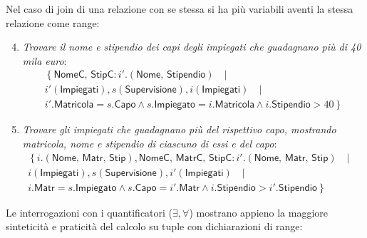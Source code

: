\documentclass[a4paper]{article}
\begin{document}
	Nel caso di join di una relazione con se stessa si ha più variabili aventi la stessa relazione come range:
	\begin{enumerate}
		\setcounter{enumi}{3}
		\item \emph{Trovare il nome e stipendio dei capi degli impiegati che guadagnano più di 40 mila euro}:
		\begin{gather*}
			\left\{
			\textsf{NomeC, StipC}: i'.\left(\textsf{Nome, Stipendio}\right) \hspace{1em} | \hspace{1em} \right. \\
			i'\left(\textsf{Impiegati}\right), s\left(\textsf{Supervisione}\right), i\left(\textsf{Impiegati}\right) \hspace{1em} | \hspace{1em} \\
			\left. i'.\textsf{Matricola} = s.\textsf{Capo} \land s.\textsf{Impiegato} = i.\textsf{Matricola} \land i.\textsf{Stipendio} > 40
			\right\}
		\end{gather*}
	
		\item \emph{Trovare gli impiegati che guadagnano più del rispettivo capo, mostrando matricola, nome e stipendio di ciascuno di essi e del capo}:
		\begin{gather*}
			\left\{
			i.\left(\textsf{Nome, Matr, Stip}\right), \textsf{NomeC, MatrC, StipC}: i'.\left(\textsf{Nome, Matr, Stip}\right) \hspace{1em} | \hspace{1em} \right. \\
			i\left(\textsf{Impiegati}\right), s\left(\textsf{Supervisione}\right), i'\left(\textsf{Impiegati}\right) \hspace{1em} | \hspace{1em} \\
			\left. i.\textsf{Matr} = s.\textsf{Impiegato} \land s.\textsf{Capo} = i'.\textsf{Matr} \land i.\textsf{Stipendio} > i'.\textsf{Stipendio}
			\right\}
		\end{gather*}
	\end{enumerate}
	Le interrogazioni con i quantificatori ($\exists, \forall$) mostrano appieno la maggiore sinteticità e praticità del calcolo su tuple con dichiarazioni di range:
\end{document}

